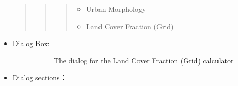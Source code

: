 \documentclass[letterpaper,10pt,english]{sphinxmanual}
\begin{document}
\begin{itemize}
\begin{quote}
\begin{quote}
\begin{itemize}
\end{itemize}
\begin{quote}
\begin{itemize}
\item {} 
Urban Morphology

\end{itemize}
\begin{itemize}
\item {} 
Land Cover Fraction (Grid)

\end{itemize}
\end{quote}
\end{quote}
\end{quote}

\item {} \begin{description}
\item[{Dialog Box:}] \leavevmode
\begin{figure}[htbp]
\centering
\capstart

\noindent{}
\caption{The dialog for the Land Cover Fraction (Grid) calculator}\label{\detokenize{pre-processor/Urban Land Cover Land Cover Fraction (Grid):id1}}\end{figure}

\end{description}

\item {} 
Dialog sections：

\end{itemize}
\end{document}
